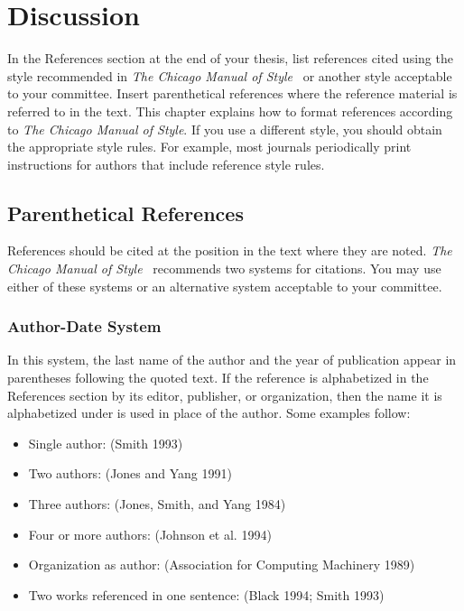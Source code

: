 \chapter{Discussion}
\label{cpt:discussion}

In the References section at the end of your thesis, list references
cited using the style recommended in \textit{The Chicago Manual of
Style}~\cite{ChicagoManual} or another style acceptable to your
committee.  Insert parenthetical references where the reference
material is referred to in the text.  This chapter explains how to
format references according to \textit{The Chicago Manual of Style}.  If you
use a different style, you should obtain the appropriate style rules.
For example, most journals periodically print instructions for authors
that include reference style rules.

\section{Parenthetical References}

References should be cited at the position in the text where they are
noted.  \textit{The Chicago Manual of Style}~\cite{ChicagoManual} recommends
two systems for citations.  You may use either of these systems or an
alternative system acceptable to your committee.

\subsection{Author-Date System}

In this system, the last name of the author and the year of
publication appear in parentheses following the quoted text.  If the
reference is alphabetized in the References section by its editor,
publisher, or organization, then the name it is alphabetized under is
used in place of the author.  Some examples follow:
\begin{itemize}
 \item Single author: (Smith 1993)
 \item Two authors: (Jones and Yang 1991)
 \item Three authors: (Jones, Smith, and Yang 1984)
 \item Four or more authors: (Johnson et al. 1994)
 \item Organization as author: (Association for Computing Machinery 1989)
 \item Two works referenced in one sentence: (Black 1994; Smith 1993)
\end{itemize}

